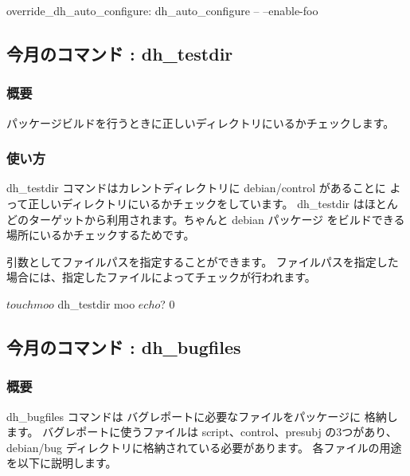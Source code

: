 \documentclass[mingoth,a4paper]{jsarticle}
\begin{document}
\begin{commandline}
override_dh_auto_configure:
    dh_auto_configure -- --enable-foo
\end{commandline}

\subsection{今月のコマンド : dh\_testdir}

\subsubsection{概要}

パッケージビルドを行うときに正しいディレクトリにいるかチェックします。

\subsubsection{使い方}

dh\_testdir コマンドはカレントディレクトリに debian/control があることに
よって正しいディレクトリにいるかチェックをしています。
dh\_testdir はほとんどのターゲットから利用されます。ちゃんと debian パッケージ
をビルドできる場所にいるかチェックするためです。



引数としてファイルパスを指定することができます。
ファイルパスを指定した場合には、指定したファイルによってチェックが行われます。

\begin{commandline}
$ touch moo
$ dh_testdir moo
$ echo $?
0
\end{commandline}

\subsection{今月のコマンド : dh\_bugfiles}

\subsubsection{概要}

dh\_bugfiles コマンドは バグレポートに必要なファイルをパッケージに
格納します。
バグレポートに使うファイルは script、control、presubj の3つがあり、
debian/bug ディレクトリに格納されている必要があります。
各ファイルの用途を以下に説明します。
\end{document}
